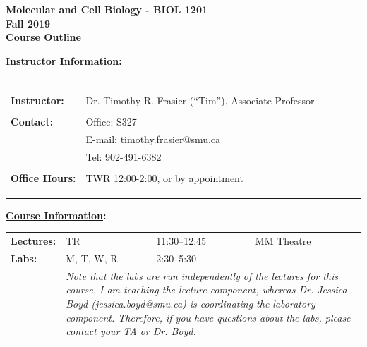 \documentclass[hidelinks]{article}
\begin{document}
\vspace*{0.01cm}

\begin{center}
	\Large{\textbf{Molecular and Cell Biology  - BIOL 1201\\
	Fall 2019\\
	Course Outline}}
\end{center}


\textbf{\underline{Instructor Information}:}\\
\\
	\begin{tabular}{@{} p{2.3cm} l }
		\textbf{Instructor:}	& Dr. Timothy R. Frasier (``Tim''), Associate Professor\\
		\\
		\textbf{Contact:} 	& Office: S327\\
					& E-mail: timothy.frasier@smu.ca\\
					& Tel: 902-491-6382\\
		\\
		\textbf{Office Hours:} & TWR 12:00-2:00, or by appointment				
	\end{tabular}

	\begin{center}
		\rule{4cm}{0.5pt}
	\end{center}


\textbf{\underline{Course Information}:}


	\begin{tabular}{@{} p{2.3cm} l l l}
		\textbf{Lectures:} & TR & 11:30--12:45 & MM Theatre\\
		\addlinespace
		\textbf{Labs:} & M, T, W, R & 2:30--5:30 &\\
			& \multicolumn{3}{p{14cm}}{\emph{Note that the labs are run independently of the lectures for this course. I am teaching the lecture component, whereas Dr. Jessica Boyd (jessica.boyd@smu.ca) is coordinating the laboratory component. Therefore, if you have questions about the labs, please contact your TA or Dr. Boyd.}}
	\end{tabular}
	
\end{document}
